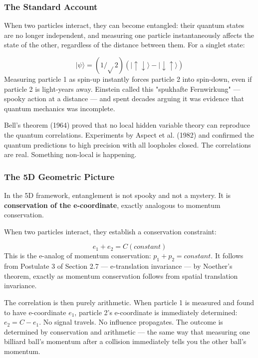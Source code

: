 \documentclass[aps,prd,preprint,superscriptaddress,longbibliography,floatfix]{revtex4-2}
\theoremstyle{remark}
\begin{document}
\subsubsection{The Standard Account}

When two particles interact, they can become entangled: their quantum states are no longer independent, and measuring one particle instantaneously affects the state of the other, regardless of the distance between them. For a singlet state:


\begin{equation}
    |\psi\rangle = (1/\sqrt{}2)(|\uparrow\downarrow\rangle - |\downarrow\uparrow\rangle)
\end{equation}
Measuring particle 1 as spin-up instantly forces particle 2 into spin-down, even if particle 2 is light-years away. Einstein called this "spukhafte Fernwirkung" --- spooky action at a distance --- and spent decades arguing it was evidence that quantum mechanics was incomplete.

Bell's theorem (1964) proved that no local hidden variable theory can reproduce the quantum correlations. Experiments by Aspect et al. (1982) and \cite{Hensenetal2015} confirmed the quantum predictions to high precision with all loopholes closed. The correlations are real. Something non-local is happening.


\subsubsection{The 5D Geometric Picture}

In the 5D framework, entanglement is not spooky and not a mystery. It is \textbf{conservation of the e-coordinate}, exactly analogous to momentum conservation.

When two particles interact, they establish a conservation constraint:


\begin{equation}
    e_{1} + e_{2} = C  (constant)
\end{equation}
This is the e-analog of momentum conservation: $p_{1} + p_{2} = constant$. It follows from Postulate 3 of Section 2.7 --- e-translation invariance --- by Noether's theorem, exactly as momentum conservation follows from spatial translation invariance.

The correlation is then purely arithmetic. When particle 1 is measured and found to have e-coordinate $e_{1}$, particle 2's e-coordinate is immediately determined: $e_{2} = C - e_{1}$. No signal travels. No influence propagates. The outcome is determined by conservation and arithmetic --- the same way that measuring one billiard ball's momentum after a collision immediately tells you the other ball's momentum.
\end{document}
